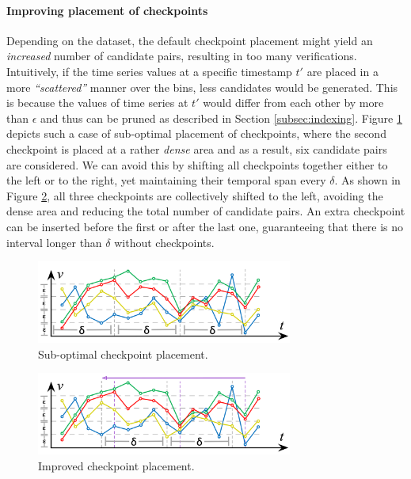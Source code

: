\paragraph{Improving placement of checkpoints} Depending on the dataset, the default checkpoint placement might yield an \textit{increased} number of candidate pairs, resulting in too many verifications. Intuitively, if the time series values at a specific timestamp $t'$ are placed in a more \textit{``scattered''} manner over the bins, less candidates would be generated. This is because the values of time series at $t'$ would differ from each other by more than $\epsilon$ and thus can be pruned as described in Section \ref{subsec:indexing}. Figure \ref{fig:opt1} depicts such a case of sub-optimal placement of checkpoints, where the second checkpoint is placed at a rather \textit{dense} area and as a result, six candidate pairs are considered. We can avoid this by shifting all checkpoints together either to the left or to the right, yet maintaining their temporal span every $\delta$. As shown in Figure \ref{fig:opt2}, all three checkpoints are collectively shifted to the left, avoiding the dense area and reducing the total number of candidate pairs. An extra checkpoint can be inserted before the first or after the last one, guaranteeing that there is no interval longer than $\delta$ without checkpoints.

\begin{figure}[tb]
    \centering
    \includegraphics[width=0.75\textwidth]{figures/sub_opt.png}
    \caption{Sub-optimal checkpoint placement.}
    \label{fig:opt1}
\end{figure}

\begin{figure}[tb]
    \centering
    \includegraphics[width=0.75\textwidth]{figures/opt.png}
    \caption{Improved checkpoint placement.}
    \label{fig:opt2}
\end{figure}

